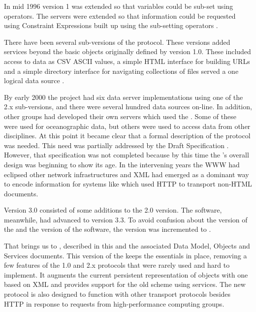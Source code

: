 \documentclass[justify]{dods-paper}
\begin{document}

In mid 1996 \DAP version 1 was extended so that variables could be
sub-set using operators. The \DODS servers were extended so that
information could be requested using Constraint Expressions built up using
the sub-setting operators \cite{gallagher:dods}.

There have been several sub-versions of the  protocol. These
versions added services beyond the basic objects originally defined by
version 1.0. These included access to data as \ac{CSV} ASCII values, a
simple \ac{HTML} interface for building \ac{URL}s and a simple
directory interface for navigating collections of files served a one
logical data source \cite{gallagher:dap-spec}.

By early 2000 the \DODS project had six data server implementations
using one of the \DAP 2.x sub-versions, and there were several hundred
data sources on-line. In addition, other groups had developed their
own servers which used the \DAP. Some of these were used for
oceanographic data, but others were used to access data from other
disciplines. At this point it became clear that a formal description
of the protocol was needed. This need was partially addressed by the
 Draft Specification \cite{gallagher:dap-spec}. However, that
specification was not completed because by this time the \DAP's
overall design was beginning to show its age. In the intervening years
the \ac{WWW} had eclipsed other network infrastructures and \ac{XML}
had emerged as a dominant way to encode information for systems like
\DODS which used \ac{HTTP} to transport non-\ac{HTML} documents.


\DAP Version 3.0 consisted of some additions to the 2.0 version.  The
\DAP software, meanwhile, had advanced to version 3.3.  To avoid
confusion about the version of the \DAP and the version of the
software, the \DAP version was incremented to \dapversion.

That brings us to \DAP \dapversion, described in this and the associated
Data Model, Objects and Services documents. This version of the \DAP
keeps the essentials in place, removing a few features of the 1.0 and 2.x
protocols that were rarely used and hard to implement. It augments the
current persistent representation of objects with one based on XML and
provides support for the old scheme using services. The new protocol is also
designed to function with other transport protocols besides HTTP in
response to requests from high-performance computing groups.
\end{document}
